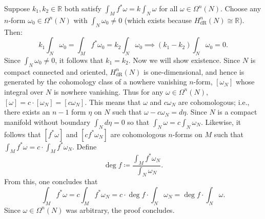 \documentclass{article}
\begin{document}
	Suppose $k_1, k_2 \in \mathbb{R}$ both satisfy $\int_M f^*\omega = k \int_N \omega$ for all $\omega \in \Omega^n(N)$. Choose any $n$-form $\omega_0 \in \Omega^n(N)$ with $\int_N \omega_0 \neq 0$ (which exists because $H^n_{\text{dR}}(N) \cong \mathbb{R}$). Then:$$k_1 \int_N \omega_0 = \int_M f^*\omega_0 = k_2 \int_N \omega_0 \implies (k_1 - k_2) \int_N \omega_0 = 0.$$ Since $\int_N \omega_0 \neq 0$, it follows that $k_1 = k_2$. Now we will show existence. Since $N$ is compact connected and oriented, $H^{n}_{\text{dR}}(N)$ is one-dimensional, and hence is generated by the cohomology class of a nowhere vanishing $n$-form, $[\omega_{N}]$ whose integral over $N$ is nowhere vanishing. Thus for any $\omega \in \Omega^{n}(N)$, $[\omega] = c \cdot [\omega_{N}] = [c\omega_{N}]$. This means that $\omega$ and $c\omega_{N}$ are cohomologous; i.e., there exists an $n-1$ form $\eta$ on $N$ such that $\omega - c\omega_{N} = d\eta$. Since $N$ is a compact manifold without boundary $\int_{N}d\eta = 0$ so that $\int_{N}\omega = c\int_{N}\omega_{N}$. Likewise, it follows that $[f^{\ast}\omega]$ and $[cf^{\ast}\omega_{N}]$ are cohomologous $n$-forms on $M$ such that $\int_{M}f^{\ast}\omega = c\cdot \int_{M}f^{\ast}\omega_{N}$. Define 
	\begin{equation*}
		\deg{f} \coloneqq \frac{\int_{M}f^{\ast}\omega_{N}}{\int_{N}\omega_{N}}. 
	\end{equation*}
	From this, one concludes that 
	\begin{equation*}
		\int_{M}f^{\ast}\omega = c\int_{M}f^{\ast}\omega_{N} = c \cdot \deg{f} \cdot \int_{N}\omega_{N} = \deg{f} \cdot \int_{N}\omega. 
	\end{equation*}
	Since $\omega \in \Omega^{n}(N)$ was arbitrary, the proof concludes. 
	
\end{document}
